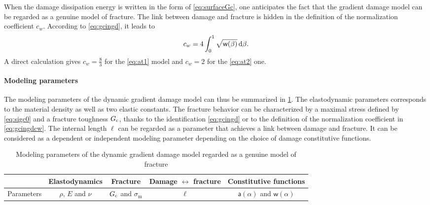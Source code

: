 When the damage dissipation energy is written in the form of \eqref{eq:surfaceGc}, one anticipates the fact that the gradient damage model can be regarded as a genuine model of fracture. The link between damage and fracture is hidden in the definition of the normalization coefficient $c_w$. According to \eqref{eq:gcingd}, it leads to
\begin{equation} \label{eq:gcingdcw}
c_w=4\int_0^1\sqrt{\mathsf{w}(\beta)}\,\mathrm{d}\beta.
\end{equation}
A direct calculation gives $c_w=\frac{8}{3}$ for the \eqref{eq:at1} model and $c_w=2$ for the \eqref{eq:at2} one.

\paragraph{Modeling parameters} The modeling parameters of the dynamic gradient damage model can thus be summarized in \cref{tab:modelgrad}. The elastodynamic parameters corresponds to the material density as well as two elastic constants. The fracture behavior can be characterized by a maximal stress defined by \eqref{eq:sigc0} and a fracture toughness $G_\mathrm{c}$, thanks to the identification \eqref{eq:gcingd} or to the definition of the normalization coefficient in \eqref{eq:gcingdcw}. The internal length $\ell$ can be regarded as a parameter that achieves a link between damage and fracture. It can be considered as a dependent or independent modeling parameter depending on the choice of damage constitutive functions.
\begin{table}[htbp]
\centering
\caption{Modeling parameters of the dynamic gradient damage model regarded as a genuine model of fracture} \label{tab:modelgrad}
\begin{tabular}{ccccc} \toprule
& Elastodynamics & Fracture & Damage $\leftrightarrow$ fracture & Constitutive functions \\ \midrule
Parameters & $\rho$, $E$ and $\nu$ & $G_\mathrm{c}$ and $\sigma_\mathrm{m}$ & $\ell$ & $\mathsf{a}(\alpha)$ and $\mathsf{w}(\alpha)$ \\ \bottomrule
\end{tabular}
\end{table}

